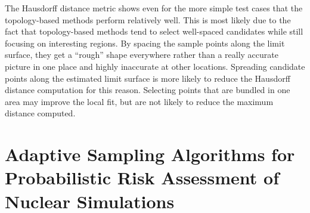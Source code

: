 The Hausdorff distance metric shows even for the more simple test cases that the topology-based methods perform relatively well.
%
This is most likely due to the fact that topology-based methods tend to select well-spaced candidates while still focusing on interesting regions.
%
By spacing the sample points along the limit surface, they get a ``rough'' shape everywhere rather than a really accurate picture in one place and highly inaccurate at other locations.
%
Spreading candidate points along the estimated limit surface is more likely to reduce the Hausdorff distance computation for this reason.
%
Selecting points that are bundled in one area may improve the local fit, but are not likely to reduce the maximum distance computed.



\section{Adaptive Sampling Algorithms for Probabilistic Risk Assessment of Nuclear Simulations}
\label{paper:psa}

% 